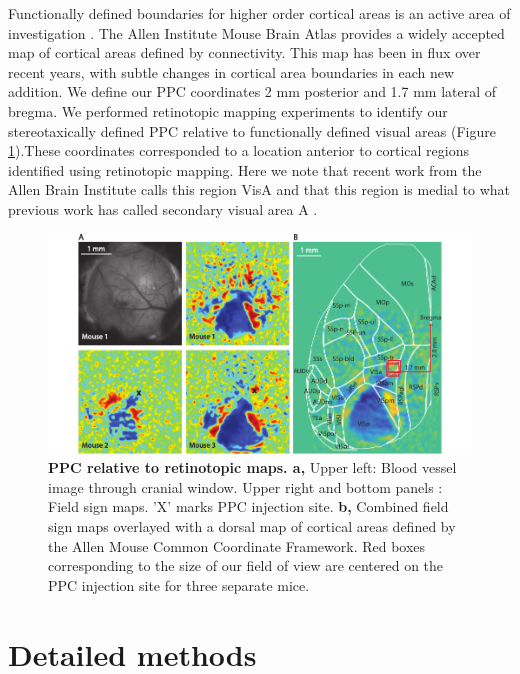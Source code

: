 \bigskip

Functionally defined boundaries for higher order cortical areas is an active area of investigation \citep{Makino2017}. The Allen Institute Mouse Brain Atlas provides a widely accepted map of cortical areas defined by connectivity. This map has been in flux over recent years, with subtle changes in cortical area boundaries in each new addition. We define our PPC coordinates 2 mm posterior and 1.7 mm lateral of bregma. We performed retinotopic mapping experiments to identify our stereotaxically defined PPC relative to functionally defined visual areas (Figure \ref{fig:widefield}).These coordinates corresponded to a location anterior to cortical regions identified using retinotopic mapping. Here we note that recent work from the Allen Brain Institute calls this region VisA \citep{CCF2015} and that this region is medial to what previous work has called secondary visual area A \citep{Wang2007}.

\begin{figure}
\includegraphics[width=\textwidth]{figures/widefield.pdf}
\caption[PPC relative to retinotopic maps]{\textbf{PPC relative to retinotopic maps. a,} Upper left: Blood vessel image through cranial window. Upper right and bottom panels : Field sign maps. 'X' marks PPC injection site.
%
\textbf{b,} Combined field sign maps overlayed with a dorsal map of cortical areas defined by the Allen Mouse Common Coordinate Framework. Red boxes corresponding to the size of our field of view are centered on the PPC injection site for three separate mice.
\label{fig:widefield}}
\end{figure}

\section{Detailed methods}

